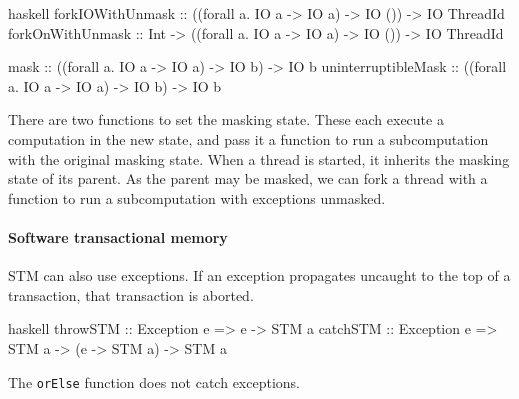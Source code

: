 \begin{listing}
\centering
\begin{cminted}{haskell}
forkIOWithUnmask    :: ((forall a. IO a -> IO a) -> IO ()) -> IO ThreadId
forkOnWithUnmask    :: Int -> ((forall a. IO a -> IO a) -> IO ()) -> IO ThreadId

mask                :: ((forall a. IO a -> IO a) -> IO b) -> IO b
uninterruptibleMask :: ((forall a. IO a -> IO a) -> IO b) -> IO b
\end{cminted}
\caption{Masking exceptions in Haskell.}\label{lst:excm_haskell}
\end{listing}

There are two functions to set the masking state.  These each execute
a computation in the new state, and pass it a function to run a
subcomputation with the original masking state.  When a thread is
started, it inherits the masking state of its parent.  As the parent
may be masked, we can fork a thread with a function to run a
subcomputation with exceptions unmasked.

\paragraph{Software transactional memory}
STM can also use exceptions.  If an exception propagates uncaught to the top of
a transaction, that transaction is aborted.

\begin{listing}
\centering
\begin{cminted}{haskell}
throwSTM :: Exception e => e -> STM a
catchSTM :: Exception e => STM a -> (e -> STM a) -> STM a
\end{cminted}
\caption{STM exceptions in Haskell.}\label{lst:excstm_haskell}
\end{listing}

The \verb|orElse| function does not catch exceptions.
